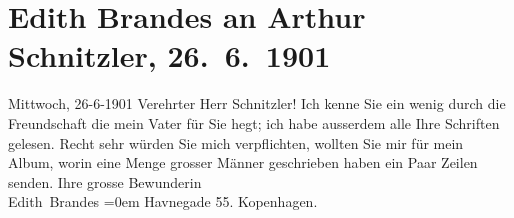 

         
         \renewcommand{\erwaehntePersonen}{Personen: Georg Brandes}
         \renewcommand{\erwaehnteOrte}{Orte: Havnegade, Kopenhagen, Wien}
         \renewcommand{\erwaehnteWerke}{}
               \section[Edith Brandes an Arthur Schnitzler, 26. 6. 1901]{ Edith Brandes an Arthur Schnitzler, 26. 6. 1901}\nopagebreak{}\rehead{ }\begin{ledgroupsized}[t]{13cm}\normalsize\beginnumbering \toendnotes[C]{\smallbreak\pagebreak[2]} 
\toendnotes[C]{\smallbreak}\pstart
           \raggedleft{}{\pb}Mittwoch, 26-6-1901\pend
           \pstart{}Verehrter Herr Schnitzler!\pend\pstart
           Ich kenne Sie ein wenig durch die Freundschaft die mein Vater für Sie hegt; ich habe ausserdem alle
               Ihre Schriften gelesen. Recht sehr würden Sie mich verpflichten, wollten Sie mir für
               mein Album, worin eine Menge grosser Männer geschrieben haben ein Paar Zeilen
               senden.\pend
           \pstart
           Ihre grosse Bewunderin{\\[\baselineskip]}\spacefill\mbox{Edith Brandes}\pend
           \leftskip=0em{}\pstart
           \noindent{}Havnegade 55. Kopenhagen.\pend
           
         
         \endnumbering{}\end{ledgroupsized}  \newcommand{\dateiname}{L01135}\newcommand{\titel}{Edith Brandes an Arthur Schnitzler, 26. 6. 1901}\newcommand{\editorInnen}{Martin Anton Müller und Gerd-Hermann Susen}
      